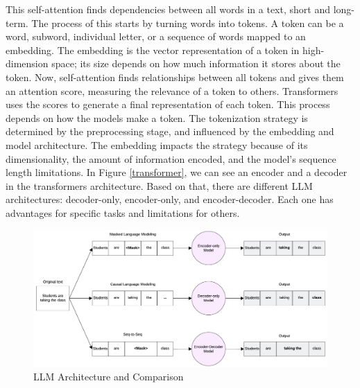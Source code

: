 This self-attention finds dependencies between all words in a text, short and long-term. The process of this starts by turning words into tokens. A token can be a word,
subword, individual letter, or a sequence of words mapped to an embedding. The embedding is the vector representation of a token in high-dimension space; its size
depends on how much information it stores about the token. Now, self-attention finds relationships between all tokens and gives them an attention score, measuring
the relevance of a token to others. Transformers uses the scores to generate a final representation of each token. This process depends on how the models make a token.
The tokenization strategy is determined by the preprocessing stage, and influenced by the embedding and model architecture. The embedding impacts the strategy
because of its dimensionality, the amount of information encoded, and the model's sequence length limitations. In Figure \ref{transformer},  we can see an encoder and a
decoder in the transformers architecture. Based on that, there are different LLM architectures: decoder-only, encoder-only, and encoder-decoder. Each one has advantages
for specific tasks and limitations for others.

\begin{figure}[!hb]
    \centering
        \includegraphics[width=1\linewidth]{images/LLM_Arch_text_generation.png}
        \caption{LLM Architecture and Comparison}
        \label{text_generation}
\end{figure}


